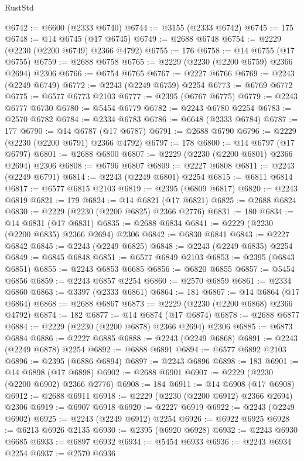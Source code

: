 \begin{lexlean}{RustStd}
\begin{coremodule}
@6742 := @6600 (@2333 @6740)
@6744 := @3155 (@2333 @6742)
@6745 := 175
@6748 := @14 @6745 (@17 @6745)
@6749 := @2688 @6748
@6754 := @2229 (@2230 (@2200 @6749) @2366 @4792)
@6755 := 176
@6758 := @14 @6755 (@17 @6755)
@6759 := @2688 @6758
@6765 := @2229 (@2230 (@2200 @6759) @2366 @2694) @2306
@6766 := @6754 @6765
@6767 := @2227 @6766
@6769 := @2243 (@2249 @6749)
@6772 := @2243 (@2249 @6759) @2254
@6773 := @6769 @6772
@6775 := @6577 @6773 @2103
@6777 := @2395 (@6767 @6775)
@6779 := @2243 @6777 @6730
@6780 := @5454 @6779
@6782 := @2243 @6780 @2254
@6783 := @2570 @6782
@6784 := @2334 @6783
@6786 := @6648 (@2333 @6784)
@6787 := 177
@6790 := @14 @6787 (@17 @6787)
@6791 := @2688 @6790
@6796 := @2229 (@2230 (@2200 @6791) @2366 @4792)
@6797 := 178
@6800 := @14 @6797 (@17 @6797)
@6801 := @2688 @6800
@6807 := @2229 (@2230 (@2200 @6801) @2366 @2694) @2306
@6808 := @6796 @6807
@6809 := @2227 @6808
@6811 := @2243 (@2249 @6791)
@6814 := @2243 (@2249 @6801) @2254
@6815 := @6811 @6814
@6817 := @6577 @6815 @2103
@6819 := @2395 (@6809 @6817)
@6820 := @2243 @6819
@6821 := 179
@6824 := @14 @6821 (@17 @6821)
@6825 := @2688 @6824
@6830 := @2229 (@2230 (@2200 @6825) @2366 @2776)
@6831 := 180
@6834 := @14 @6831 (@17 @6831)
@6835 := @2688 @6834
@6841 := @2229 (@2230 (@2200 @6835) @2366 @2694) @2306
@6842 := @6830 @6841
@6843 := @2227 @6842
@6845 := @2243 (@2249 @6825)
@6848 := @2243 (@2249 @6835) @2254
@6849 := @6845 @6848
@6851 := @6577 @6849 @2103
@6853 := @2395 (@6843 @6851)
@6855 := @2243 @6853 @6685
@6856 := @6820 @6855
@6857 := @5454 @6856
@6859 := @2243 @6857 @2254
@6860 := @2570 @6859
@6861 := @2334 @6860
@6863 := @3397 (@2333 @6861)
@6864 := 181
@6867 := @14 @6864 (@17 @6864)
@6868 := @2688 @6867
@6873 := @2229 (@2230 (@2200 @6868) @2366 @4792)
@6874 := 182
@6877 := @14 @6874 (@17 @6874)
@6878 := @2688 @6877
@6884 := @2229 (@2230 (@2200 @6878) @2366 @2694) @2306
@6885 := @6873 @6884
@6886 := @2227 @6885
@6888 := @2243 (@2249 @6868)
@6891 := @2243 (@2249 @6878) @2254
@6892 := @6888 @6891
@6894 := @6577 @6892 @2103
@6896 := @2395 (@6886 @6894)
@6897 := @2243 @6896
@6898 := 183
@6901 := @14 @6898 (@17 @6898)
@6902 := @2688 @6901
@6907 := @2229 (@2230 (@2200 @6902) @2366 @2776)
@6908 := 184
@6911 := @14 @6908 (@17 @6908)
@6912 := @2688 @6911
@6918 := @2229 (@2230 (@2200 @6912) @2366 @2694) @2306
@6919 := @6907 @6918
@6920 := @2227 @6919
@6922 := @2243 (@2249 @6902)
@6925 := @2243 (@2249 @6912) @2254
@6926 := @6922 @6925
@6928 := @6213 @6926 @2135
@6930 := @2395 (@6920 @6928)
@6932 := @2243 @6930 @6685
@6933 := @6897 @6932
@6934 := @5454 @6933
@6936 := @2243 @6934 @2254
@6937 := @2570 @6936

\end{coremodule}
\end{lexlean}
